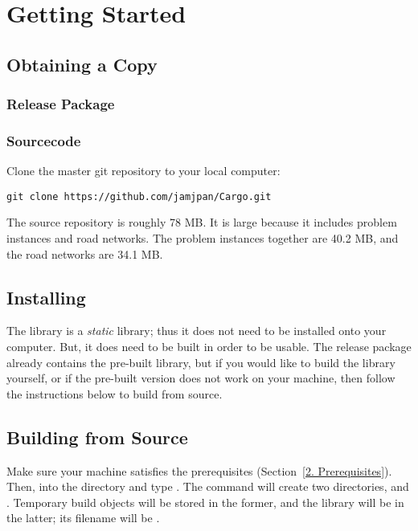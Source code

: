 \section{Getting Started}

\subsection{Obtaining a Copy}

\subsubsection{Release Package}

\subsubsection{Sourcecode}

Clone the master  git repository to your local computer:
\begin{verbatim}
git clone https://github.com/jamjpan/Cargo.git
\end{verbatim}

The source repository is roughly 78 MB. It is large because it includes problem
instances and road networks. The problem instances together are 40.2 MB, and
the road networks are 34.1 MB.

\subsection{Installing}

The  library is a \emph{static} library; thus it does not need
to be installed onto your computer. But, it does need to be built in order to
be usable. The release package already contains the pre-built library, but if
you would like to build the library yourself, or if the pre-built version does
not work on your machine, then follow the instructions below to build from source.

\subsection{Building from Source}

Make sure your machine satisfies the prerequisites (Section~\ref{2. Prerequisites}).
Then,  into the  directory and type . The
command will create two directories,  and . Temporary
build objects will be stored in the former, and the library will be in the latter;
its filename will be .

